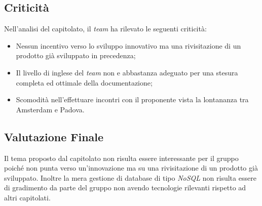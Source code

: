 \subsection{Criticità}
Nell'analisi del capitolato, il \textit{team} ha rilevato le seguenti criticità:
\begin{itemize}
	\item Nessun incentivo verso lo sviluppo innovativo ma una rivisitazione di un prodotto già sviluppato in precedenza;
	\item Il livello di inglese del \textit{team} non e abbastanza adeguato per una stesura completa ed ottimale della documentazione;
	\item Scomodità nell'effettuare incontri con il proponente vista la lontananza tra Amsterdam e Padova.
\end{itemize}

\subsection{Valutazione Finale}
Il tema proposto dal capitolato non risulta essere interessante per il gruppo poiché non punta verso un'innovazione ma su una rivisitazione di un prodotto già sviluppato.
Inoltre la mera gestione di database di tipo \textit{NoSQL} non risulta essere di gradimento da parte del gruppo non avendo tecnologie rilevanti rispetto ad altri capitolati.
